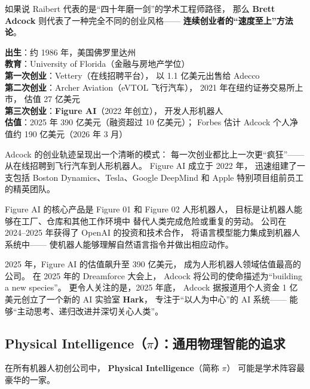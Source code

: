 如果说 Raibert 代表的是``四十年磨一剑''的学术工程师路径，
那么 \textbf{Brett Adcock} 则代表了一种完全不同的创业风格——
\textbf{连续创业者的``速度至上''方法论}。

\begin{corebox}
\textbf{出生}：约 1986 年，美国佛罗里达州\\
\textbf{教育}：University of Florida（金融与房地产学位）\\
\textbf{第一次创业}：Vettery（在线招聘平台），
以 1.1 亿美元出售给 Adecco\\
\textbf{第二次创业}：Archer Aviation（eVTOL 飞行汽车），
2021 年在纽约证券交易所上市，
估值 27 亿美元\\
\textbf{第三次创业}：\textbf{Figure AI}（2022 年创立），
开发人形机器人\\
\textbf{估值}：2025 年 390 亿美元（融资超过 10 亿美元）；
Forbes 估计 Adcock 个人净值约 190 亿美元（2026 年 3 月）
\end{corebox}

Adcock 的创业轨迹呈现出一个清晰的模式：
每一次创业都比上一次更``疯狂''——
从在线招聘到飞行汽车到人形机器人。
Figure AI 成立于 2022 年，
迅速组建了一支包括 Boston Dynamics、Tesla、Google DeepMind
和 Apple 特别项目组前员工的精英团队。

Figure AI 的核心产品是 Figure 01 和 Figure 02 人形机器人，
目标是让机器人能够在工厂、仓库和其他工作环境中
替代人类完成危险或重复的劳动。
公司在 2024--2025 年获得了 OpenAI 的投资和技术合作，
将语言模型能力集成到机器人系统中——
使机器人能够理解自然语言指令并做出相应动作。

2025 年，Figure AI 的估值飙升至 390 亿美元，
成为人形机器人领域估值最高的公司。
在 2025 年的 Dreamforce 大会上，
Adcock 将公司的使命描述为``building a new species''。
更令人关注的是，2025 年底，
Adcock 据报道用个人资金 1 亿美元创立了一个新的 AI 实验室 \textbf{Hark}，
专注于``以人为中心''的 AI 系统——
能够``主动思考、递归改进并深切关心人类''。


\subsection{Physical Intelligence（$\pi$）：通用物理智能的追求}
\label{subsec:physical-intelligence}

在所有机器人初创公司中，
\textbf{Physical Intelligence}（简称 $\pi$）
可能是学术阵容最豪华的一家。

